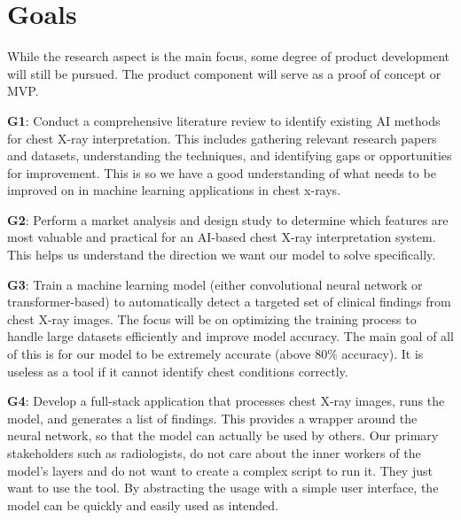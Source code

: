 \documentclass{article}
\begin{document}
\section{Goals}
While the research aspect is the main focus, some degree of product development will still be pursued. The product component will serve as a proof of concept or MVP.\\
\begin{itemize}
\begin{item}
    \textbf{G1}: Conduct a comprehensive literature review to identify existing AI methods for chest X-ray interpretation. This includes gathering relevant research papers and datasets, understanding the techniques, and identifying gaps or opportunities for improvement. 
    This is so we have a good understanding of what needs to be improved on in machine learning 
    applications in chest x-rays.
\end{item}
\begin{item}
    \textbf{G2}: Perform a market analysis and design study to determine which features are most valuable and practical for an AI-based chest X-ray interpretation system. This helps us
    understand the direction we want our model to solve specifically.
\end{item}
\begin{item}
    \textbf{G3}: Train a machine learning model (either convolutional neural network or transformer-based) to automatically detect a targeted set of clinical findings from chest X-ray images. The focus will be on optimizing the training process to handle large datasets efficiently and improve model accuracy. The main goal of all of this is for our model to be
    extremely accurate (above 80\% accuracy). It is useless as a tool if it cannot identify 
    chest conditions correctly.
\end{item}
\begin{item}
    \textbf{G4}: Develop a full-stack application that processes chest X-ray images, runs the model, and generates a list of findings. This provides a wrapper around the neural network,
    so that the model can actually be used by others. Our primary stakeholders such as 
    radiologists, do not care about the inner workers of the model's layers and do not want to 
    create a complex script to run it. They just want to use the tool. By abstracting the usage 
    with a simple user interface, the model can be quickly and easily used as intended.
\end{item}
\begin{item}

\end{item}
\end{itemize}
\end{document}
